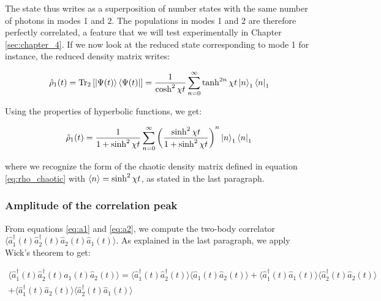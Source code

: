 \noindent The state thus writes as a superposition of number states with the same number of photons in modes 1 and 2. The populations in modes 1 and 2 are therefore perfectly correlated, a feature that we will test experimentally in Chapter \ref{sec:chapter_4}. If we now look at the reduced state corresponding to mode 1 for instance, the reduced density matrix writes:

\begin{equation}
    \hat{\rho}_1 (t) = \mathrm{Tr}_2 \left[ \ket{\Psi(t)} \bra{\Psi(t)} \right] = \frac{1}{\cosh^2 \chi t} \sum_{n=0}^{\infty}\tanh^{2n} \chi t \ket{n}_1 \bra{n}_1
\end{equation}

\noindent Using the properties of hyperbolic functions, we get:

\begin{equation}
 \hat{\rho}_1 (t) = \frac{1}{1+ \sinh^2 \chi t} \sum_{n=0}^{\infty} \left( \frac{\sinh^2 \chi t}{1+\sinh^2 \chi t} \right)^n \ket{n}_1 \bra{n}_1
\end{equation}

\noindent where we recognize the form of the chaotic density matrix defined in equation \ref{eq:rho_chaotic} with $\left\langle n\right\rangle = \sinh^2 \chi t$, as stated in the last paragraph.


\subsubsection{Amplitude of the correlation peak}

\noindent From equations \ref{eq:a1} and \ref{eq:a2}, we compute the two-body correlator $\langle \hat{a}_1^{\dagger}(t) \hat{a}_2^{\dagger}(t) \hat{a}_2(t) \hat{a}_1(t) \rangle$. As explained in the last paragraph, we apply Wick's theorem to get:

\begin{equation}
\begin{split}
    \langle \hat{a}_1^{\dagger}(t) \hat{a}_2^{\dagger}(t) \hat{a}_1(t) \hat{a}_2(t) \rangle = \langle \hat{a}_1^{\dagger}(t) \hat{a}_2^{\dagger}(t) \rangle \langle \hat{a}_1(t) \hat{a}_2(t) \rangle +  \langle \hat{a}_1^{\dagger}(t) \hat{a}_1(t) \rangle \langle \hat{a}_2^{\dagger}(t) \hat{a}_2(t) \rangle \\
    +  \langle \hat{a}_1^{\dagger}(t) \hat{a}_2(t) \rangle \langle \hat{a}_2^{\dagger}(t) \hat{a}_1(t) \rangle
\end{split}
\end{equation}

